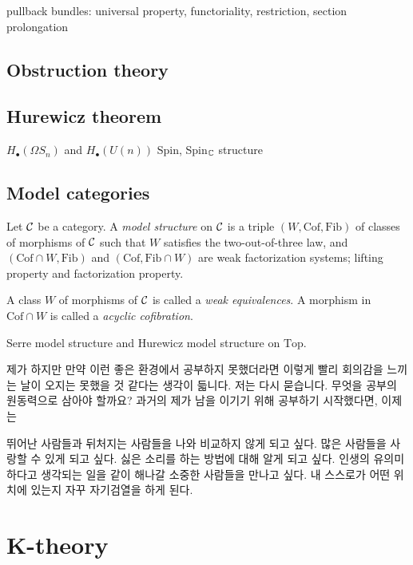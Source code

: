 \documentclass{../../large}
\newcommand{\Cof}{\mathrm{Cof}}
\newcommand{\Fib}{\mathrm{Fib}}
\begin{document}
pullback bundles: universal property, functoriality, restriction,
section prolongation

\section{Obstruction theory}
\section{Hurewicz theorem}
$H_\bullet(\Omega S_n)$ and $H_\bullet(U(n))$
Spin, Spin$_{\mathbb{C}}$ structure
\section{Model categories}
\begin{prb}
Let $\mathcal{C}$ be a category.
A \emph{model structure} on $\mathcal{C}$ is a triple $(W,\Cof,\Fib)$ of classes of morphisms of $\mathcal{C}$ such that $W$ satisfies the two-out-of-three law, and $(\Cof\cap W,\Fib)$ and $(\Cof,\Fib\cap W)$ are weak factorization systems; lifting property and factorization property.

A class $W$ of morphisms of $\mathcal{C}$ is called a \emph{weak equivalences}.
A morphism in $\Cof\cap W$ is called a \emph{acyclic cofibration}.
\end{prb}


Serre model structure and Hurewicz model structure on $\mathrm{Top}$.











제가 
하지만 만약 이런 좋은 환경에서 공부하지 못했더라면 이렇게 빨리 회의감을 느끼는 날이 오지는 못했을 것 같다는 생각이 듧니다.
저는 다시 묻습니다. 무엇을 공부의 원동력으로 삼아야 할까요?
과거의 제가 남을 이기기 위해 공부하기 시작했다면, 이제는 


뛰어난 사람들과 뒤처지는 사람들을 나와 비교하지 않게 되고 싶다.
많은 사람들을 사랑할 수 있게 되고 싶다.
싫은 소리를 하는 방법에 대해 알게 되고 싶다.
인생의 유의미하다고 생각되는 일을 같이 해나갈 소중한 사람들을 만나고 싶다.
내 스스로가 어떤 위치에 있는지 자꾸 자기검열을 하게 된다.









\chapter{K-theory}
\end{document}

